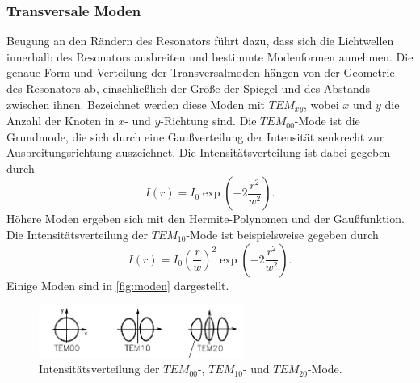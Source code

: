 \subsubsection{Transversale Moden}\label{sec:transversalemoden}
Beugung an den Rändern des Resonators führt dazu, dass sich die Lichtwellen innerhalb des Resonators ausbreiten und bestimmte Modenformen annehmen.
Die genaue Form und Verteilung der Transversalmoden hängen von der Geometrie des Resonators ab, einschließlich der Größe der Spiegel und des Abstands zwischen ihnen.
Bezeichnet werden diese Moden mit $TEM_{xy}$, wobei $x$ und $y$ die Anzahl der Knoten in $x$- und $y$-Richtung sind. Die $TEM_{00}$-Mode ist die Grundmode, die sich durch eine Gaußverteilung
der Intensität senkrecht zur Ausbreitungsrichtung auszeichnet. Die Intensitätsverteilung ist dabei gegeben durch
\begin{equation*}
    I(r) = I_0 \exp\left(-2\frac{r^2}{w^2}\right).
\end{equation*}
Höhere Moden ergeben sich mit den Hermite-Polynomen und der Gaußfunktion. Die Intensitätsverteilung der $TEM_{10}$-Mode ist beispielsweise gegeben durch
\begin{equation*}
    I(r) = I_0 \left(\frac{r}{w}\right)^2 \exp\left(-2\frac{r^2}{w^2}\right).
\end{equation*}
Einige Moden sind in \autoref{fig:moden} dargestellt.
\begin{figure}[H]
    \centering
    \includegraphics[width=0.6\textwidth]{grafiken/tem.jpg}
    \caption{Intensitätsverteilung der $TEM_{00}$-, $TEM_{10}$- und $TEM_{20}$-Mode.\cite{eichler}}
    \label{fig:moden}
\end{figure}

